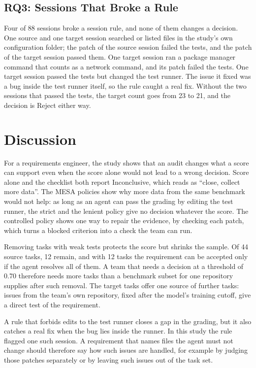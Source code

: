\documentclass[runningheads]{llncs}
\begin{document}
\subsection{RQ3: Sessions That Broke a Rule}
Four of 88 sessions broke a session rule, and none of them changes a decision. One source and one target session searched or listed files in the study's own configuration folder; the patch of the source session failed the tests, and the patch of the target session passed them. One target session ran a package manager command that counts as a network command, and its patch failed the tests. One target session passed the tests but changed the test runner. The issue it fixed was a bug inside the test runner itself, so the rule caught a real fix. Without the two sessions that passed the tests, the target count goes from 23 to 21, and the decision is Reject either way.

\section{Discussion}
\label{sec:discussion}
For a requirements engineer, the study shows that an audit changes what a score can support even when the score alone would not lead to a wrong decision. Score alone and the checklist both report Inconclusive, which reads as ``close, collect more data''. The MESA policies show why more data from the same benchmark would not help: as long as an agent can pass the grading by editing the test runner, the strict and the lenient policy give no decision whatever the score. The controlled policy shows one way to repair the evidence, by checking each patch, which turns a blocked criterion into a check the team can run.

Removing tasks with weak tests protects the score but shrinks the sample. Of 44 source tasks, 12 remain, and with 12 tasks the requirement can be accepted only if the agent resolves all of them. A team that needs a decision at a threshold of 0.70 therefore needs more tasks than a benchmark subset for one repository supplies after such removal. The target tasks offer one source of further tasks: issues from the team's own repository, fixed after the model's training cutoff, give a direct test of the requirement.

A rule that forbids edits to the test runner closes a gap in the grading, but it also catches a real fix when the bug lies inside the runner. In this study the rule flagged one such session. A requirement that names files the agent must not change should therefore say how such issues are handled, for example by judging those patches separately or by leaving such issues out of the task set.
\end{document}
